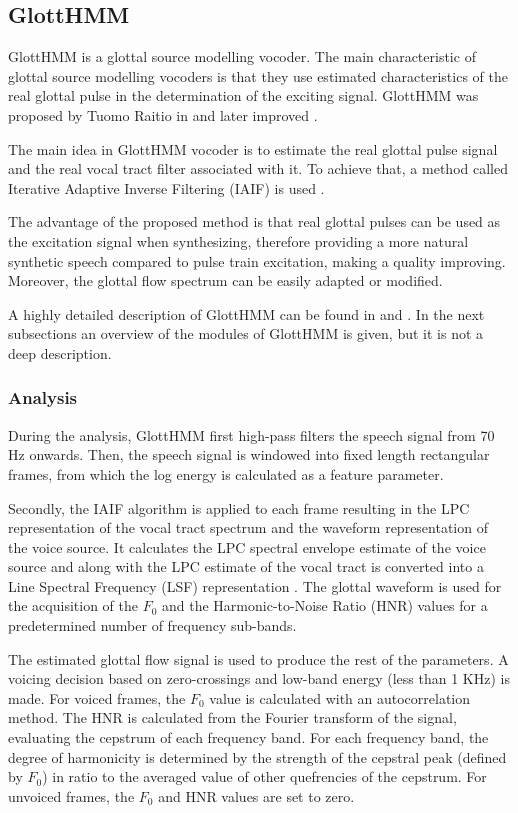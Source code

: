 \subsection{GlottHMM}
\label{vocoders_glott}
GlottHMM is a glottal source modelling vocoder.
%
The main characteristic of glottal source modelling vocoders is that they use estimated characteristics of the real glottal pulse in the determination of the exciting signal.
%
GlottHMM was proposed by Tuomo Raitio in \cite{TuomoMSc} and later improved \cite{raitio_tasl}.

The main idea in GlottHMM vocoder is to estimate the real glottal pulse signal and the real vocal tract filter associated with it.
%
To achieve that, a method called Iterative Adaptive Inverse Filtering (IAIF) is used \cite{alku1992glottal}.
%

The advantage of the proposed method is that real glottal pulses can be used as the excitation signal when synthesizing, therefore providing a more natural synthetic speech compared to pulse train excitation, making a quality improving.
%
Moreover, the glottal flow spectrum can be easily adapted or modified.

A highly detailed description of GlottHMM can be found in \cite{TuomoMSc} and \cite{manuMSc}.
%
In the next subsections an overview of the modules of GlottHMM is given, but it is not a deep description.

\subsubsection{Analysis}
\label{vocoders_glott_analysis}
During the analysis, GlottHMM first high-pass filters the speech signal from 70 Hz onwards.
%
Then, the speech signal is windowed into fixed length rectangular frames, from which the log energy is calculated as a feature parameter.

Secondly, the IAIF algorithm is applied to each frame resulting in the LPC representation of the vocal tract spectrum and the waveform representation of the voice source.
%
It calculates the LPC spectral envelope estimate of the voice source and along with the LPC estimate of the vocal tract is converted into a Line Spectral Frequency (LSF) representation \cite{manuMSc}.
%
The glottal waveform is used for the acquisition of the $F_{0}$ and the Harmonic-to-Noise Ratio (HNR) values for a predetermined number of frequency sub-bands.

The estimated glottal flow signal is used to produce the rest of the parameters. A voicing decision based on zero-crossings and low-band energy (less than 1 KHz) is made.
%
For voiced frames, the $F_{0}$ value is calculated with an autocorrelation method.
%
The HNR is calculated from the Fourier transform of the signal, evaluating the cepstrum of each frequency band.
%
For each frequency band, the degree of harmonicity is determined by the strength of the cepstral peak (defined by $F_{0}$) in ratio to the averaged value of other quefrencies of the cepstrum. 
%
For unvoiced frames, the $F_{0}$ and HNR values are set to zero.

